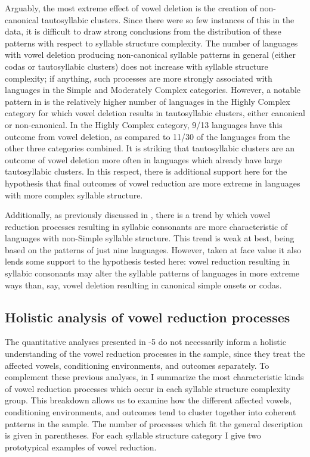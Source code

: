   Arguably, the most extreme effect of vowel deletion is the creation of non-canonical tautosyllabic clusters. Since there were so few instances of this in the data, it is difficult to draw strong conclusions from the distribution of these patterns with respect to syllable structure complexity. The number of languages with vowel deletion producing non-canonical syllable patterns in general (either codas or tautosyllabic clusters) does not increase with syllable structure complexity; if anything, such processes are more strongly associated with languages in the Simple and Moderately Complex categories. However, a notable pattern in  is the relatively higher number of languages in the Highly Complex category for which vowel deletion results in tautosyllabic clusters, either canonical or non-canonical. In the Highly Complex category, 9/13 languages have this outcome from vowel deletion, as compared to 11/30 of the languages from the other three categories combined. It is striking that tautosyllabic clusters are an outcome of vowel deletion more often in languages which already have large tautosyllabic clusters. In this respect, there is additional support here for the hypothesis that final outcomes of vowel reduction are more extreme in languages with more complex syllable structure.   

  Additionally, as previously discussed in , there is a trend by which vowel reduction processes resulting in syllabic consonants are more characteristic of languages with non-Simple syllable structure. This trend is weak at best, being based on the patterns of just nine languages. However, taken at face value it also lends some support to the hypothesis tested here: vowel reduction resulting in syllabic consonants may alter the syllable patterns of languages in more extreme ways than, say, vowel deletion resulting in canonical simple onsets or codas.

\subsection{Holistic analysis of vowel reduction processes}\label{sec:6.3.6}

  The quantitative analyses presented in -5 do not necessarily inform a holistic understanding of the vowel reduction processes in the sample, since they treat the affected vowels, conditioning environments, and outcomes separately. To complement these previous analyses, in  I summarize the most characteristic kinds of vowel reduction processes which occur in each syllable structure complexity group. This breakdown allows us to examine how the different affected vowels, conditioning environments, and outcomes tend to cluster together into coherent patterns in the sample. The number of processes which fit the general description is given in parentheses. For each syllable structure category I give two prototypical examples of vowel reduction.

